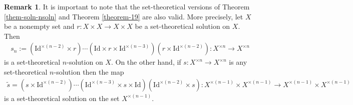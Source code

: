 \documentclass[a4paper,reqno,10pt]{amsart}
\theoremstyle{plain}
\newtheorem{thm}{Theorem}[section]
\theoremstyle{definition}
\newtheorem{remark}[thm]{Remark}
\theoremstyle{remark}
\begin{document}
\begin{remark}\label{remark-yb-nyb-vv}
    It is important to note that the set-theoretical versions of Theorem \ref{them-soln-nsoln} and Theorem \ref{theorem-19} are also valid. More precisely, let $X$ be a nonempty set and $r : X \times X \rightarrow X \times X$ be a set-theoretical solution on $X$. Then 
    \begin{align*}
        s_n :=    (\mathrm{Id}^{\times (n-2)} \times r) \cdots (\mathrm{Id} \times r \times \mathrm{Id}^{\times (n-3)}) (r \times \mathrm{Id}^{\times (n-2)})   : X^{\times n} \rightarrow X^{\times n}
    \end{align*}
    is a set-theoretical $n$-solution on $X$. On the other hand, if $s : X^{\times n} \rightarrow X^{\times n}$ is any set-theoretical $n$-solution then the map
    \begin{align*}
        \widetilde{s} =  (s \times \mathrm{Id}^{\times (n-2)}) \cdots  ( \mathrm{Id}^{\times (n-3)} \times s \times \mathrm{Id}) (\mathrm{Id}^{\times (n-2)} \times s)   : X^{\times (n-1)} \times  X^{\times (n-1)} \rightarrow X^{\times (n-1)} \times  X^{\times (n-1)}
    \end{align*}
    is a set-theoretical solution on the set $X^{\times (n-1)}$.
\end{remark}

\end{document}
